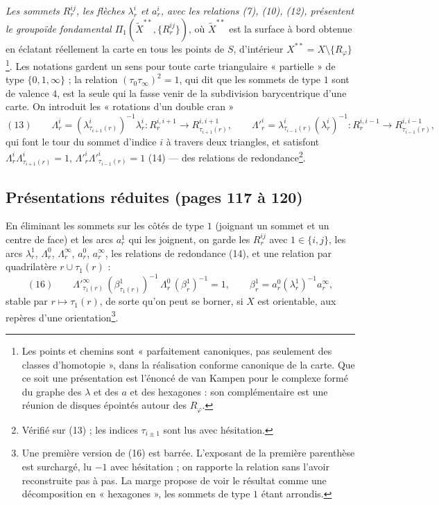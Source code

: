 \documentclass[11pt,a4paper]{article}
\begin{document}
\emph{Les sommets $R^{ij}_r$, les flèches $\lambda^i_r$ et $a^i_r$, avec les
relations (7), (10), (12), présentent le groupoïde fondamental
$\Pi_1(\widetilde{X}^{**}, \{R^{ij}_r\})$}, où $\widetilde{X}^{**}$ est la
surface à bord obtenue en éclatant réellement la carte en tous les points de
$S$, d'intérieur $X^{**} = X \setminus \{R_\varphi\}$\footnote{Les points et
chemins sont « parfaitement canoniques, pas seulement des classes
d'homotopie », dans la réalisation conforme canonique de la carte. Que ce soit
une présentation est l'énoncé de van Kampen pour le complexe formé du graphe
des $\lambda$ et des $a$ et des hexagones : son complémentaire est une réunion
de disques épointés autour des $R_\varphi$.}. Les notations gardent un sens
pour toute carte triangulaire « partielle » de type $\{0, 1, \infty\}$ ; la
relation $(\tau_0\tau_\infty)^2 = 1$, qui dit que les sommets de type $1$ sont
de valence $4$, est la seule qui la fasse venir de la subdivision barycentrique
d'une carte. On introduit les « rotations d'un double cran »
\[
(13)\qquad \Lambda^i_r = (\lambda^i_{\tau_{i+1}(r)})^{-1}\lambda^i_r : R^{i,i+1}_r \to R^{i,i+1}_{\tau_{i+1}(r)}, \qquad
\Lambda'^i_r = \lambda^i_{\tau_{i-1}(r)}(\lambda^i_r)^{-1} : R^{i,i-1}_r \to R^{i,i-1}_{\tau_{i-1}(r)},
\]
qui font le tour du sommet d'indice $i$ à travers deux triangles, et
satisfont $\Lambda^i_r\Lambda^i_{\tau_{i+1}(r)} = 1$,
$\Lambda'^i_r\Lambda'^i_{\tau_{i-1}(r)} = 1$ (14) — des relations de
redondance\footnote{Vérifié sur (13) ; les indices $\tau_{i\pm 1}$ sont lus
avec hésitation.}.

\subsection*{Présentations réduites (pages 117 à 120)}

En éliminant les sommets sur les côtés de type $1$ (joignant un sommet et un
centre de face) et les arcs $a^1_r$ qui les joignent, on garde les $R^{ij}_r$
avec $1 \in \{i, j\}$, les arcs $\lambda^1_r$, $\Lambda^0_r$,
$\Lambda^\infty_r$, $a^0_r$, $a^\infty_r$, les relations de redondance (14), et
une relation par quadrilatère $r \cup \tau_1(r)$ :
\[
(16)\qquad \Lambda'^\infty_{\tau_1(r)}\,(\beta^1_{\tau_1(r)})^{-1}\,\Lambda^0_r\,(\beta^1_r)^{-1} = 1, \qquad \beta^1_r = a^0_r(\lambda^1_r)^{-1}a^\infty_r ,
\]
stable par $r \mapsto \tau_1(r)$, de sorte qu'on peut se borner, si $X$ est
orientable, aux repères d'une orientation\footnote{Une première version de
(16) est barrée. L'exposant de la première parenthèse est surchargé, lu $-1$
avec hésitation ; on rapporte la relation sans l'avoir reconstruite pas à
pas. La marge propose de voir le résultat comme une décomposition en « hexagones », les sommets de type $1$ étant arrondis.}.
\end{document}
